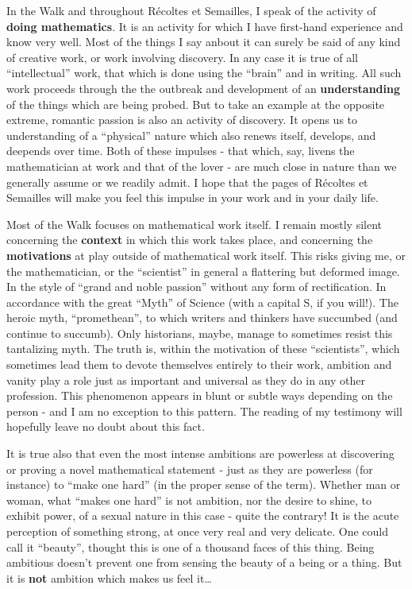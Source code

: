 In the Walk and throughout R\'ecoltes et Semailles, I speak of the activity of 
\textbf{doing mathematics}.
It is an activity for which I have first-hand experience and know very well. Most of the
things I say anbout it can surely be said of any kind of creative work, or work involving
discovery. 
In any case it is true of all ``intellectual''
work, that which is done using the ``brain'' and in writing. 
All such work proceeds through the the outbreak and development of an
\textbf{understanding} of the things which are being probed. 
But to take an example at the 
opposite extreme, romantic passion is also an activity of discovery. 
It opens us to understanding of a ``physical'' nature which also renews itself, develops, and
deepends over time. 
Both of these impulses - 
that which, say, livens the mathematician at work and
that of the lover 
- are much close in nature than we generally assume or we readily admit. 
I hope that the pages of 
R\'ecoltes et Semailles 
will make you feel this impulse in your work and in your daily life. 

Most of the Walk focuses on mathematical work itself. 
I remain mostly silent concerning the \textbf{context} in which this work takes place, and
concerning the \textbf{motivations} at play outside of mathematical work itself. 
This risks giving me, or the mathematician, or the ``scientist'' in general 
a flattering but deformed image. 
In the style of ``grand and noble passion'' without any form of rectification.
In accordance with the great ``Myth'' of Science 
(with a capital S, if you will!).
The heroic myth, ``promethean'', to which writers and thinkers have succumbed 
(and continue to succumb). 
Only historians, maybe, manage to sometimes resist this tantalizing myth. 
The truth is, within the motivation of these ``scientists'',
which sometimes lead them to devote themselves entirely to their work, ambition and vanity
play a role just as important and universal as they do in any other profession. 
This phenomenon 
appears in
blunt or subtle ways depending on the person - and I am no exception to this pattern.
The reading of my testimony will hopefully leave no doubt about this fact. 

It is true also that even the most intense ambitions are
powerless at discovering or proving a novel mathematical statement - just as they are
powerless (for instance) to ``make one hard'' (in the proper sense of the term).
Whether man or woman, what ``makes one hard'' is not ambition, nor the desire to shine, to
exhibit power, of a sexual nature in this case - quite the contrary!
It is the acute perception of something strong, at once very real and very delicate. 
One could call it ``beauty'', thought this is one of
a thousand faces of this thing. Being ambitious doesn't prevent one from 
sensing the beauty of a being or a thing. But it is \textbf{not} ambition which makes us
feel it\ldots 

